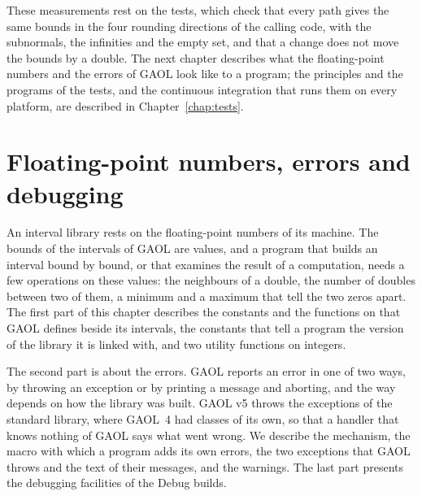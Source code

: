 \documentclass[12pt,a4paper,twoside,openright]{book}
\begin{document}
\medskip
These measurements rest on the tests, which check that every path gives the
same bounds in the four rounding directions of the calling code, with the
subnormals, the infinities and the empty set, and that a change does not
move the bounds by a double. The next chapter describes what the floating-point
numbers and the errors of GAOL look like to a program; the principles
and the programs of the tests, and the continuous integration that runs them
on every platform, are described in Chapter~\ref{chap:tests}.

\chapter{Floating-point numbers, errors and debugging}%
\label{chap:errors}\label{chap:numbers}

An interval library rests on the floating-point numbers of its machine. The
bounds of the intervals of GAOL are  values, and a program that
builds an interval bound by bound, or that examines the result of a
computation, needs a few operations on these values: the neighbours of a
double, the number of doubles between two of them, a minimum and a maximum
that tell the two zeros apart. The first part of this chapter describes the
constants and the functions on  that GAOL defines beside its
intervals, the constants that tell a program the version of the library it
is linked with, and two utility functions on integers.

\medskip
The second part is about the errors. GAOL reports an error in one of two
ways, by throwing an exception or by printing a message and aborting, and the
way depends on how the library was built. GAOL v5 throws the exceptions of
the standard library, where GAOL~4 had classes of its own, so that a handler
that knows nothing of GAOL says what went wrong.\newinvfive{} We describe
the mechanism, the macro with which a program adds its own errors, the two
exceptions that GAOL throws and the text of their messages, and the warnings.
The last part presents the debugging facilities of the Debug builds.
\end{document}
